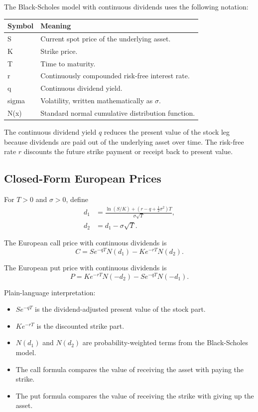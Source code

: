 \documentclass[11pt,a4paper]{article}
\begin{document}
The Black-Scholes model with continuous dividends uses the following notation:
\begin{longtable}{>{\ttfamily}p{}p{}}
\toprule
Symbol & Meaning \\
\midrule
\endhead
S & Current spot price of the underlying asset. \\
K & Strike price. \\
T & Time to maturity. \\
r & Continuously compounded risk-free interest rate. \\
q & Continuous dividend yield. \\
sigma & Volatility, written mathematically as \(\sigma\). \\
N(x) & Standard normal cumulative distribution function. \\
\bottomrule
\end{longtable}

The continuous dividend yield \(q\) reduces the present value of the stock leg because dividends
are paid out of the underlying asset over time. The risk-free rate \(r\) discounts the future strike
payment or receipt back to present value.

\subsection{Closed-Form European Prices}

For \(T>0\) and \(\sigma>0\), define
\begin{align}
  d_1 &= \frac{\ln(S/K) + \left(r-q+\tfrac{1}{2}\sigma^2\right)T}
              {\sigma\sqrt{T}}, \\
  d_2 &= d_1 - \sigma\sqrt{T}.
\end{align}

The European call price with continuous dividends is
\begin{equation}
  C = S e^{-qT} N(d_1) - K e^{-rT} N(d_2).
\end{equation}

The European put price with continuous dividends is
\begin{equation}
  P = K e^{-rT} N(-d_2) - S e^{-qT} N(-d_1).
\end{equation}

Plain-language interpretation:
\begin{itemize}
  \item \(S e^{-qT}\) is the dividend-adjusted present value of the stock part.
  \item \(K e^{-rT}\) is the discounted strike part.
  \item \(N(d_1)\) and \(N(d_2)\) are probability-weighted terms from the Black-Scholes model.
  \item The call formula compares the value of receiving the asset with paying the strike.
  \item The put formula compares the value of receiving the strike with giving up the asset.
\end{itemize}
\end{document}
